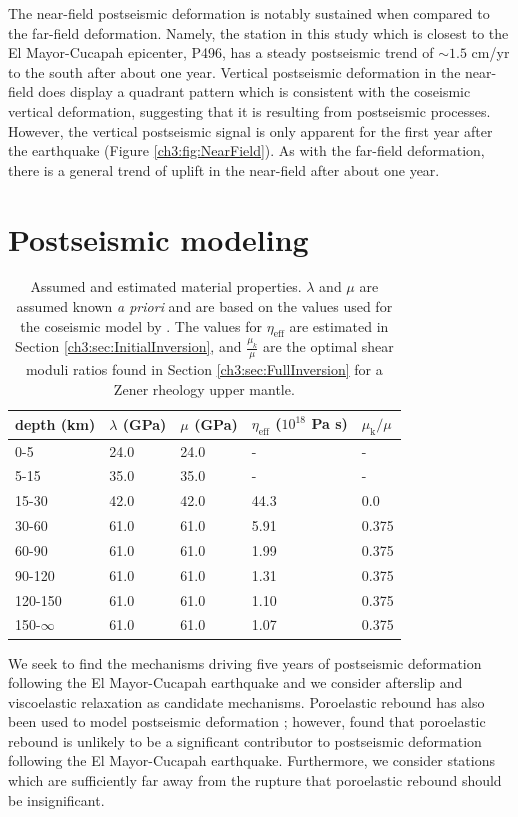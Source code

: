 The near-field postseismic deformation is notably sustained when compared to the far-field deformation.  Namely, the station in this study which is closest to the El Mayor-Cucapah epicenter, P496, has a steady postseismic trend of ${\sim}1.5$ cm/yr to the south after about one year.  Vertical postseismic deformation in the near-field does display a quadrant pattern which is consistent with the coseismic vertical deformation, suggesting that it is resulting from postseismic processes.  However, the vertical postseismic signal is only apparent for the first year after the earthquake (Figure \ref{ch3:fig:NearField}).  As with the far-field deformation, there is a general trend of uplift in the near-field after about one year. 

\section{Postseismic modeling}\label{ch3:sec:Model}

\begin{table}\label{ch3:tab:MaterialProperties}
\begin{tabular} {l l l l l}
depth (km) &$\lambda$ (GPa)&$\mu$ (GPa)&$\eta_\mathrm{eff}$ ($10^{18}$ Pa s) & $\mu_\mathrm{k}/\mu$\\ \hline
0-5 & 24.0 & 24.0 & - & -\\
5-15 & 35.0 & 35.0 & - & -\\
15-30 & 42.0 & 42.0 & 44.3 & 0.0\\
30-60 & 61.0 & 61.0 & 5.91 & 0.375\\
60-90 & 61.0 & 61.0 & 1.99 & 0.375\\
90-120 & 61.0 & 61.0 & 1.31 & 0.375\\
120-150 & 61.0 & 61.0 & 1.10 & 0.375\\
150-$\infty$ & 61.0 & 61.0 & 1.07 & 0.375\\
\end{tabular}
\caption{Assumed and estimated material properties. $\lambda$ and $\mu$ are assumed known \textit{a priori} and are based on the values used for the coseismic model by \citet{Wei2011}.  The values for $\eta_\mathrm{eff}$ are estimated in Section \ref{ch3:sec:InitialInversion}, and $\frac{\mu_k}{\mu}$ are the optimal shear moduli ratios found in Section \ref{ch3:sec:FullInversion} for a Zener rheology upper mantle.} 
\end{table}

We seek to find the mechanisms driving five years of postseismic deformation following the El Mayor-Cucapah earthquake and we consider afterslip and viscoelastic relaxation as candidate mechanisms.  Poroelastic rebound has also been used to model postseismic deformation \citep[e.g.][]{Jonsson2003}; however, \citet{Gonzalez-ortega2014} found that poroelastic rebound is unlikely to be a significant contributor to postseismic deformation following the El Mayor-Cucapah earthquake. Furthermore, we consider stations which are sufficiently far away from the rupture that poroelastic rebound should be insignificant.  

